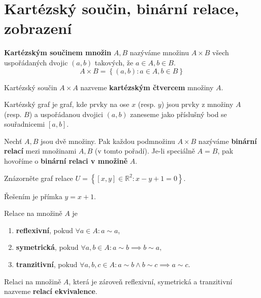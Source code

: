 \section{Kartézský součin, binární relace, zobrazení}
\begin{definition}
  \textbf{Kartézským součinem množin} $A,B$ nazýváme množinu $A\times B$ všech uspořádaných dvojic $(a,b)$ takových, že $a\in A,b\in B$.
  \[
    A \times B = \left \{ (a,b): a\in A,b\in B \right \}
  \]
\end{definition}

\begin{pozn}
  Kartézský součin $A\times A$ nazveme \textbf{kartézským čtvercem} množiny $A$.
\end{pozn}

\begin{pozn}
  Kartézský graf je graf, kde prvky na ose $x$ (resp. $y$) jsou prvky z množiny $A$ (resp. $B$) a uspořádanou dvojici $(a,b)$ zaneseme jako příslušný bod se souřadnicemi $[a,b].$
\end{pozn}

\begin{definition}
  Nechť $A,B$ jsou dvě množiny. Pak každou podmnožinu $A\times B$ nazýváme \textbf{binární relací} mezi množinami $A,B$ (v tomto pořadí). Je-li speciálně $A=B$, pak hovoříme o \textbf{binární relaci v množině} $A$.
\end{definition}

\begin{priklad}
Znázorněte graf relace $U=\left \{ \left [ x,y \right ]\in \mathbb R^2: x-y+1=0  \right \}. $
\end{priklad}

\begin{reseni}
Řešením je přímka $y=x+1.$
\end{reseni}

\begin{definition}
  Relace na množině $A$ je
  \begin{enumerate}[$i.$]
    \item \textbf{reflexivní}, pokud $\forall a\in A: a\sim a$,
    \item \textbf{symetrická}, pokud $\forall a,b \in A: a\sim b \implies b\sim a,$
    \item \textbf{tranzitivní}, pokud $\forall a,b,c\in A: a\sim b \land b\sim c \implies a\sim c.$
  \end{enumerate}
\end{definition}

\begin{definition}
  Relaci na množině $A$, která je zároveň reflexivní, symetrická a tranzitivní nazveme \textbf{relací ekvivalence}.
\end{definition}

